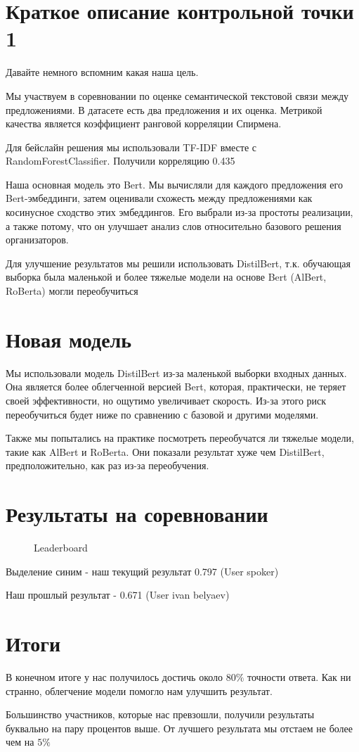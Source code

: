 \documentclass[12pt]{article}
\newcommand{\imgh}[3]
{
\begin{figure}[H]
\center{\texttt{[image: \#2]}}
\caption{#3}
\label{ris:#2}
\end{figure}
}
\begin{document}
\tableofcontents
\newpage

\section{Краткое описание контрольной точки 1}

Давайте немного вспомним какая наша цель.

Мы участвуем в соревновании по оценке семантической текстовой связи между предложениями. В датасете есть два предложения и их оценка. Метрикой качества является коэффициент ранговой корреляции Спирмена.

Для бейслайн решения мы использовали TF-IDF вместе с RandomForestClassifier. Получили корреляцию 0.435

Наша основная модель это Bert. Мы вычисляли для каждого предложения его Bert-эмбеддинги, затем оценивали схожесть между предложениями как косинусное сходство этих эмбеддингов. Его выбрали из-за простоты реализации, а также потому, что он улучшает анализ слов относительно базового решения организаторов. 

Для улучшение результатов мы решили использовать DistilBert, т.к. обучающая выборка была маленькой и более тяжелые модели на основе Bert (AlBert, RoBerta) могли переобучиться

\newpage

\section{Новая модель}

Мы использовали модель DistilBert из-за маленькой выборки входных данных. Она является более облегченной версией Bert, которая, практически, не теряет своей эффективности, но ощутимо увеличивает скорость. Из-за этого риск переобучиться будет ниже по сравнению с базовой и другими моделями. 

Также мы попытались на практике посмотреть переобучатся ли тяжелые модели, такие как AlBert и RoBerta. Они показали результат хуже чем DistilBert, предположительно, как раз из-за переобучения. 

\newpage

\section{Результаты на соревновании}

\imgh{17cm}{leaderboard 2.png}{Leaderboard}

Выделение синим - наш текущий результат 0.797 (User spoker)

Наш прошлый результат - 0.671 (User ivan belyaev)

\newpage

\section{Итоги}

В конечном итоге у нас получилось достичь около 80$\%$ точности ответа. Как ни странно, облегчение модели помогло нам улучшить результат. 

Большинство участников, которые нас превзошли, получили результаты буквально на пару процентов выше. От лучшего результата мы отстаем не более чем на $5\%$
\end{document}
